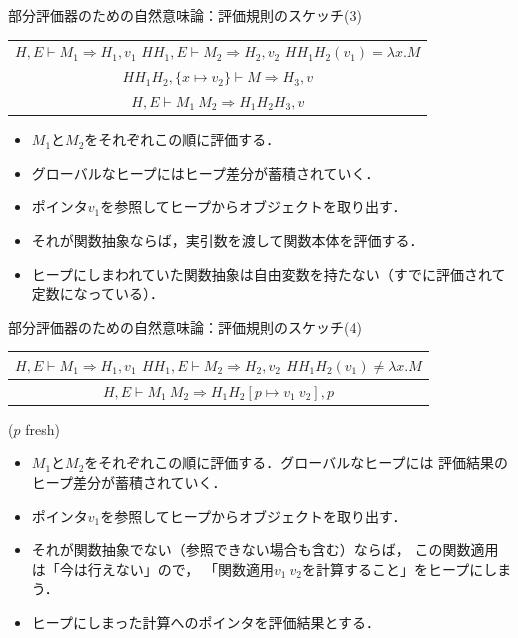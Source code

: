 \documentclass[aspectratio=169,t,dvipdfmx,12pt]{beamer}
\newcommand\infer[2]{\begin{tabular}{c}#1\relax\\\hline#2\end{tabular}}
\begin{document}
\begin{frame}{部分評価器のための自然意味論：評価規則のスケッチ(3)}

\begin{center}
\infer
{$H, E \vdash M_1 \Rightarrow H_1, v_1$\qquad
 $HH_1, E \vdash M_2 \Rightarrow H_2, v_2$\qquad
 $HH_1H_2(v_1) = \lambda x.M$\\
 $HH_1H_2, \{x\mapsto v_2\} \vdash M \Rightarrow H_3, v$}
{$H, E \vdash M_1\ M_2 \Rightarrow H_1H_2H_3, v$}
\end{center}
\begin{itemize}
\item $M_1$と$M_2$をそれぞれこの順に評価する．
\item グローバルなヒープにはヒープ差分が蓄積されていく．
\item ポインタ$v_1$を参照してヒープからオブジェクトを取り出す．
\item それが関数抽象ならば，実引数を渡して関数本体を評価する．
\item ヒープにしまわれていた関数抽象は自由変数を持たない（すでに評価されて
定数になっている）．
\end{itemize}

\end{frame}

\begin{frame}{部分評価器のための自然意味論：評価規則のスケッチ(4)}

\begin{center}
\infer
{$H, E \vdash M_1 \Rightarrow H_1, v_1$\qquad
 $HH_1, E \vdash M_2 \Rightarrow H_2, v_2$\qquad
 $HH_1H_2(v_1) \not= \lambda x.M$}
{$H, E \vdash M_1\ M_2 \Rightarrow H_1H_2[p\mapsto v_1\ v_2], p$}
($p$ fresh)
\end{center}
\begin{itemize}
\item $M_1$と$M_2$をそれぞれこの順に評価する．グローバルなヒープには
評価結果のヒープ差分が蓄積されていく．
\item ポインタ$v_1$を参照してヒープからオブジェクトを取り出す．
\item それが関数抽象でない（参照できない場合も含む）ならば，
この関数適用は「今は行えない」ので，
「関数適用$v_1\ v_2$を計算すること」をヒープにしまう．
\item ヒープにしまった計算へのポインタを評価結果とする．
\end{itemize}

\end{frame}
\end{document}
